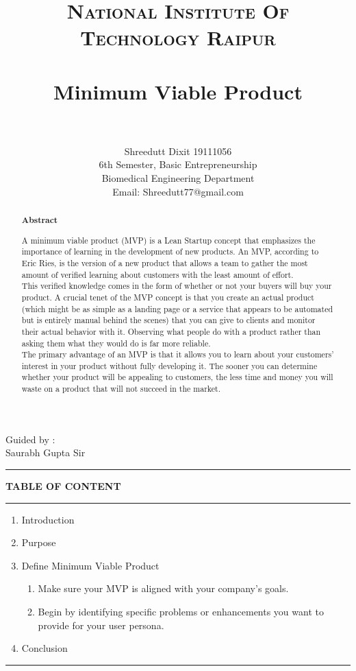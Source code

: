 \documentclass[paper=a4, fontsize=11pt]{scrartcl}
\title{
		\usefont{OT1}{bch}{b}{n}
		\normalfont \normalsize \textsc{National Institute Of Technology Raipur} \\ [25pt]
		\horrule{0.5pt} \\[0.4cm]
		\huge Minimum Viable Product  \\
		\horrule{2pt} \\[0.5cm]
}
\author{
        Shreedutt Dixit 19111056\\6th Semester, 
        Basic Entrepreneurship\\ Biomedical Engineering Department\\	
        Email: Shreedutt77@gmail.com
        \normalsize
}
\date{}
\numberwithin{equation}{section}		%
\numberwithin{figure}{section}			%
\numberwithin{table}{section}				%
\begin{document}
\maketitle
\begin{flushright}
    Guided by :\\
    Saurabh Gupta Sir
\end{flushright}

\noindent\rule{\textwidth}{1pt}
\begin{abstract}

    \begin{center}
        \Large{\textbf{Abstract}}\\
        
    \end{center}

    \Large { A minimum viable product (MVP) is a Lean Startup concept that emphasizes the importance of learning in the development of new products. An MVP, according to Eric Ries, is the version of a new product that allows a team to gather the most amount of verified learning about customers with the least amount of effort.\\
    This verified knowledge comes in the form of whether or not your buyers will buy your product.
    A crucial tenet of the MVP concept is that you create an actual product (which might be as simple as a landing page or a service that appears to be automated but is entirely manual behind the scenes) that you can give to clients and monitor their actual behavior with it. 
    \newpage Observing what people do with a product rather than asking them what they would do is far more reliable.\\
    The primary advantage of an MVP is that it allows you to learn about your customers' interest in your product without fully developing it. The sooner you can determine whether your product will be appealing to customers, the less time and money you will waste on a product that will not succeed in the market. }
\end{abstract}

\newpage
\textbf{TABLE OF CONTENT}\\
\rule{\textwidth}{1pt}
\begin{enumerate}
    \item Introduction
    \item Purpose
    \item Define Minimum Viable Product
    \begin{enumerate}
        \item Make sure your MVP is aligned with your company's goals.
        \item Begin by identifying specific problems or enhancements you want to provide for your user persona.
    \end{enumerate}
    \item Conclusion
\end{enumerate}
\rule{\textwidth}{1pt}
\newpage
\Large
\end{document}
